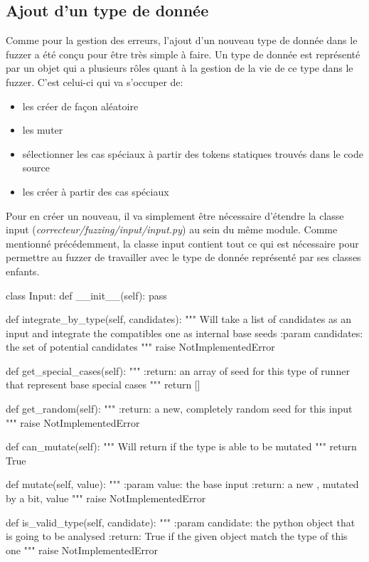 \documentclass[a4paper]{report}
\begin{document}
\subsection{Ajout d'un type de donnée}

Comme pour la gestion des erreurs, l'ajout d'un nouveau type de donnée dans le fuzzer a été conçu pour être très simple à faire.
Un type de donnée est représenté par un objet qui a plusieurs rôles quant à la gestion de la vie de ce type dans le fuzzer.
C'est celui-ci qui va s'occuper de:
\begin{itemize}
\item les créer de façon aléatoire
\item les muter
\item sélectionner les cas spéciaux à partir des tokens statiques trouvés dans le code source
\item les créer à partir des cas spéciaux
\end{itemize}

Pour en créer un nouveau, il va simplement être nécessaire d'étendre la classe input (\textit{correcteur/fuzzing/input/input.py}) au sein du même module.
Comme mentionné précédemment, la classe input contient tout ce qui est nécessaire pour permettre au fuzzer de travailler avec le type de donnée représenté par ses classes enfants.
\begin{python}
class Input:
    def __init__(self):
        pass

    def integrate_by_type(self, candidates):
        """
        Will take a list of candidates as an input
        and integrate the compatibles one as internal
        base seeds
        :param candidates: the set of potential candidates
        """
        raise NotImplementedError

    def get_special_cases(self):
        """
        :return: an array of seed for this type of
        	runner that represent base special cases
        """
        return []

    def get_random(self):
        """
        :return: a new, completely random seed for
        	this input
        """
        raise NotImplementedError

    def can_mutate(self):
        """
        Will return if the type is able to be mutated
        """
        return True

    def mutate(self, value):
        """
        :param value: the base input
        :return: a new , mutated by a bit, value
        """
        raise NotImplementedError

    def is_valid_type(self, candidate):
        """
        :param candidate: the python object that is
        	going to be analysed
        :return: True if the given object match the
        	type of this one
        """
        raise NotImplementedError
\end{python}
\end{document}
